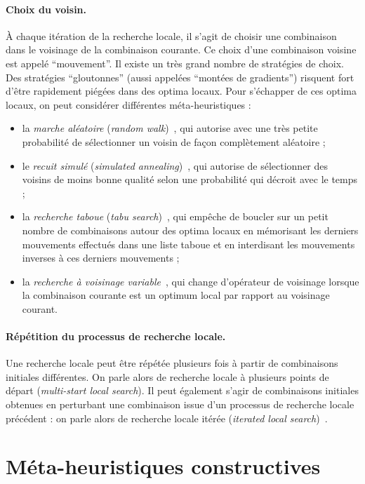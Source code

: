 \documentclass[12pt,a4paper]{book}
\begin{document}
\paragraph{Choix du voisin.}
À chaque itération de la recherche locale, il s'agit de choisir une combinaison dans le voisinage de la combinaison courante. Ce choix d'une combinaison voisine est appelé ``mouvement''. Il existe un très grand nombre de stratégies de choix. Des stratégies ``gloutonnes'' (aussi appelées ``montées de gradients'') risquent fort d'être rapidement piégées dans des optima locaux. Pour s'échapper de ces optima locaux, on peut considérer différentes méta-heuristiques :
\begin{itemize}
  \item la \textit{marche aléatoire} (\textit{random walk})~\cite{selman1994noise}, qui autorise avec une très petite probabilité de sélectionner un voisin de façon complètement aléatoire ;
  \item le \textit{recuit simulé} (\textit{simulated annealing})~\cite{aarts1989}, qui autorise de sélectionner des voisins de moins bonne qualité selon une probabilité qui décroit avec le temps ;
  \item la \textit{recherche taboue} (\textit{tabu search})~\cite{glover1993}, qui empêche de boucler sur un petit nombre de combinaisons autour des optima locaux en mémorisant les derniers mouvements effectués dans une liste taboue et en interdisant les mouvements inverses à ces derniers mouvements ;
  \item la \textit{recherche à voisinage variable}~\cite{mladenovic1997}, qui change d'opérateur de voisinage lorsque la combinaison courante est un optimum local par rapport au voisinage courant.
\end{itemize}

\paragraph{Répétition du processus de recherche locale.}
Une recherche locale peut être répétée plusieurs fois à partir de combinaisons initiales différentes. On parle alors de recherche locale à plusieurs points de départ (\textit{multi-start local search}). Il peut également s'agir de combinaisons initiales obtenues en perturbant une combinaison issue d'un processus de recherche locale précédent : on parle alors de recherche locale itérée (\textit{iterated local search})~\cite{lourenco2002}.

\section{Méta-heuristiques constructives}
\label{sec:constructives}
\end{document}
